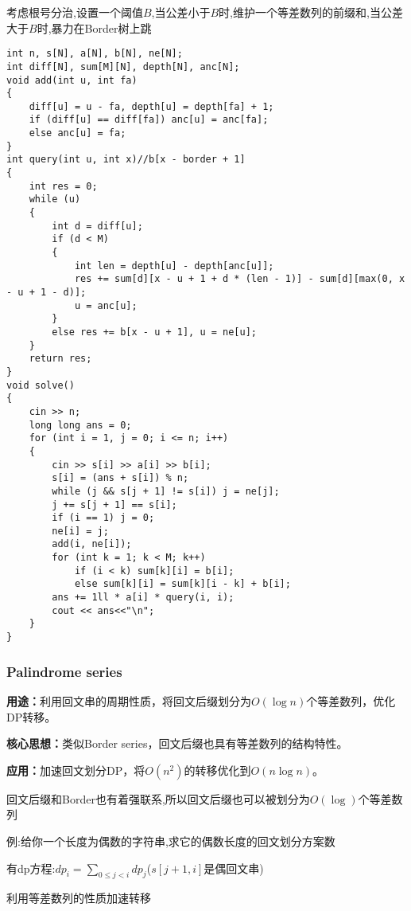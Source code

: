 \documentclass[a4paper, fontset=none]{ctexart}
\begin{document}
考虑根号分治,设置一个阈值$B$,当公差小于$B$时,维护一个等差数列的前缀和,当公差大于$B$时,暴力在Border树上跳

\begin{verbatim}
int n, s[N], a[N], b[N], ne[N];
int diff[N], sum[M][N], depth[N], anc[N];
void add(int u, int fa)
{
    diff[u] = u - fa, depth[u] = depth[fa] + 1;
    if (diff[u] == diff[fa]) anc[u] = anc[fa];
    else anc[u] = fa;
}
int query(int u, int x)//b[x - border + 1]
{
    int res = 0;
    while (u)
    {
        int d = diff[u];
        if (d < M)
        {
            int len = depth[u] - depth[anc[u]];
            res += sum[d][x - u + 1 + d * (len - 1)] - sum[d][max(0, x - u + 1 - d)];
            u = anc[u];
        }
        else res += b[x - u + 1], u = ne[u];
    }
    return res;
}
void solve()
{
    cin >> n;
    long long ans = 0;
    for (int i = 1, j = 0; i <= n; i++)
    {
        cin >> s[i] >> a[i] >> b[i];
        s[i] = (ans + s[i]) % n;
        while (j && s[j + 1] != s[i]) j = ne[j];
        j += s[j + 1] == s[i];
        if (i == 1) j = 0;
        ne[i] = j;
        add(i, ne[i]);
        for (int k = 1; k < M; k++)
            if (i < k) sum[k][i] = b[i];
            else sum[k][i] = sum[k][i - k] + b[i];
        ans += 1ll * a[i] * query(i, i);
        cout << ans<<"\n";
    }
}
\end{verbatim}
\subsubsection{Palindrome series}
\textbf{用途：}利用回文串的周期性质，将回文后缀划分为$O(\log n)$个等差数列，优化DP转移。

\textbf{核心思想：}类似Border series，回文后缀也具有等差数列的结构特性。

\textbf{应用：}加速回文划分DP，将$O(n ^ 2)$的转移优化到$O(n\log n)$。

回文后缀和Border也有着强联系,所以回文后缀也可以被划分为$O(\log)$个等差数列

例:给你一个长度为偶数的字符串,求它的偶数长度的回文划分方案数

有dp方程:$dp_i=\sum\limits_{0\leqslant j < i}dp_j$($s[j+1, i]$是偶回文串)

利用等差数列的性质加速转移
\end{document}

